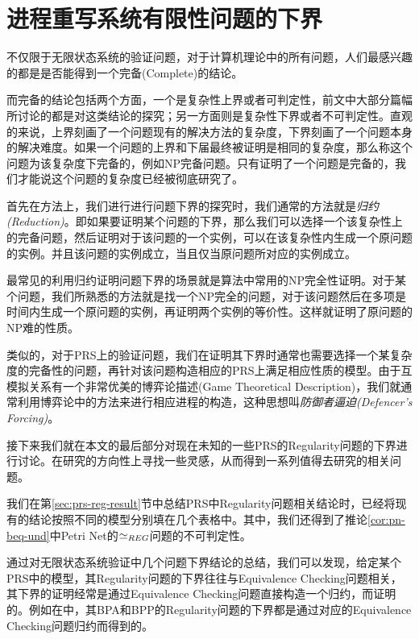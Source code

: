 \section{进程重写系统有限性问题的下界}
\label{sec:lower-bound}

不仅限于无限状态系统的验证问题，对于计算机理论中的所有问题，人们最感兴趣的都是是否能得到一个完备(Complete)的结论。

而完备的结论包括两个方面，一个是复杂性上界或者可判定性，前文中大部分篇幅所讨论的都是对这类结论的探究；另一方面则是复杂性下界或者不可判定性。直观的来说，上界刻画了一个问题现有的解决方法的复杂度，下界刻画了一个问题本身的解决难度。如果一个问题的上界和下届最终被证明是相同的复杂度，那么称这个问题为该复杂度下完备的，例如NP完备问题。只有证明了一个问题是完备的，我们才能说这个问题的复杂度已经被彻底研究了。

首先在方法上，我们进行进行问题下界的探究时，我们通常的方法就是\emph{归约(Reduction)}。即如果要证明某个问题的下界，那么我们可以选择一个该复杂性上的完备问题，然后证明对于该问题的一个实例，可以在该复杂性内生成一个原问题的实例。并且该问题的实例成立，当且仅当原问题所对应的实例成立。

最常见的利用归约证明问题下界的场景就是算法中常用的NP完全性证明。对于某个问题，我们所熟悉的方法就是找一个NP完全的问题，对于该问题然后在多项是时间内生成一个原问题的实例，再证明两个实例的等价性。这样就证明了原问题的NP难的性质。

类似的，对于PRS上的验证问题，我们在证明其下界时通常也需要选择一个某复杂度的完备性的问题，再针对该问题构造相应的PRS上满足相应性质的模型。由于互模拟关系有一个非常优美的博弈论描述(Game Theoretical Description)，我们就通常利用博弈论中的方法来进行相应进程的构造，这种思想叫\emph{防御者逼迫(Defencer's Forcing)}\cite{Jancar2008}。

接下来我们就在本文的最后部分对现在未知的一些PRS的Regularity问题的下界进行讨论。在研究的方向性上寻找一些灵感，从而得到一系列值得去研究的相关问题。

我们在第\ref{sec:prs-reg-result}节中总结PRS中Regularity问题相关结论时，已经将现有的结论按照不同的模型分别填在几个表格中。其中，我们还得到了推论\ref{cor:pn-beq-und}中Petri Net的$\simeq_{REG}$问题的不可判定性。

通过对无限状态系统验证中几个问题下界结论的总结，我们可以发现，给定某个PRS中的模型，其Regularity问题的下界往往与Equivalence Checking问题相关，其下界的证明经常是通过Equivalence Checking问题直接构造一个归约，而证明的。例如在\cite{Srba2002b,Srba2002a}中，其BPA和BPP的Regularity问题的下界都是通过对应的Equivalence Checking问题归约而得到的。

